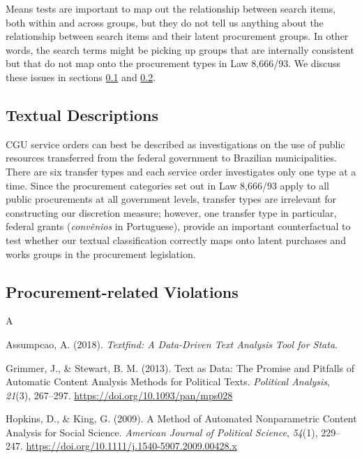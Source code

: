 \documentclass[]{article}
\theoremstyle{definition}
\theoremstyle{definition}
\theoremstyle{definition}
\theoremstyle{remark}
\begin{document}
Means tests are important to map out the relationship between search
items, both within and across groups, but they do not tell us anything
about the relationship between search items and their latent procurement
groups. In other words, the search terms might be picking up groups that
are internally consistent but that do not map onto the procurement types
in Law 8,666/93. We discuss these issues in sections \ref{quality2} and
\ref{quality3}.

\hypertarget{quality2}{%
\subsection{Textual Descriptions}\label{quality2}}

CGU service orders can best be described as investigations on the use of
public resources transferred from the federal government to Brazilian
municipalities. There are six transfer types and each service order
investigates only one type at a time. Since the procurement categories
set out in Law 8,666/93 apply to all public procurements at all
government levels, transfer types are irrelevant for constructing our
discretion measure; however, one transfer type in particular, federal
grants (\emph{convênios} in Portuguese), provide an important
counterfactual to test whether our textual classification correctly maps
onto latent purchases and works groups in the procurement legislation.

\hypertarget{quality3}{%
\subsection{Procurement-related Violations}\label{quality3}}

A

\hypertarget{refs}{}
\leavevmode\hypertarget{ref-AssumpcaotextfindDataDrivenText2018}{}%
Assumpcao, A. (2018). \emph{Textfind: A Data-Driven Text Analysis Tool
for Stata}.

\leavevmode\hypertarget{ref-GrimmerTextDataPromise2013a}{}%
Grimmer, J., \& Stewart, B. M. (2013). Text as Data: The Promise and
Pitfalls of Automatic Content Analysis Methods for Political Texts.
\emph{Political Analysis}, \emph{21}(3), 267--297.
\url{https://doi.org/10.1093/pan/mps028}

\leavevmode\hypertarget{ref-HopkinsMethodAutomatedNonparametric2009}{}%
Hopkins, D., \& King, G. (2009). A Method of Automated Nonparametric
Content Analysis for Social Science. \emph{American Journal of Political
Science}, \emph{54}(1), 229--247.
\url{https://doi.org/10.1111/j.1540-5907.2009.00428.x}
\end{document}
